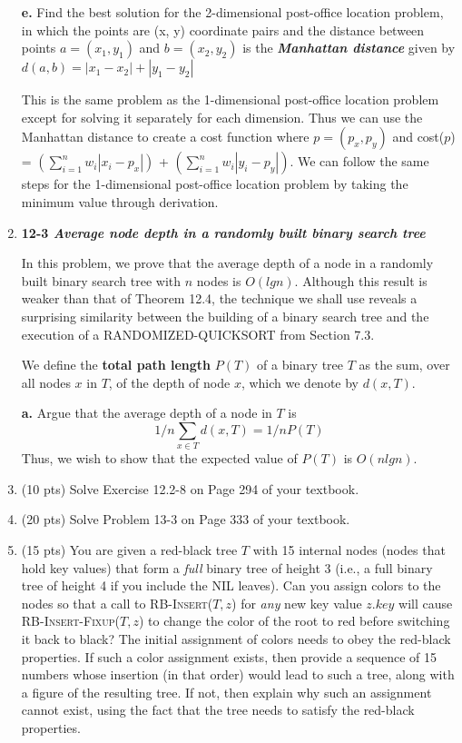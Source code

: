 \documentclass{article}
\begin{document}
\begin{enumerate}
\newpage

\subitem \textbf{e.} Find the best solution for the 2-dimensional post-office location problem, in which the points are (x, y) coordinate pairs and the distance between points $a = (x_1, y_1)$ and $b = (x_2, y_2)$ is the \textbf{\textit{Manhattan distance}} given by $d(a, b) = |x_1 - x_2| + |y_1 - y_2|$

This is the same problem as the 1-dimensional post-office location problem except for solving it separately for each dimension. Thus we can use the Manhattan distance to create a cost function where $p = (p_x, p_y)$ and cost($p$) = $(\sum_{i = 1}^{n} w_i |x_i - p_x|)$ + $(\sum_{i = 1}^{n} w_i |y_i - p_y|)$. We can follow the same steps for the 1-dimensional post-office location problem by taking the minimum value through derivation.

\newpage

\item \textbf{12-3 \textit{Average node depth in a randomly built binary search tree}}

In this problem, we prove that the average depth of a node in a randomly built binary search tree with $n$ nodes is $O(lgn)$. Although this result is weaker than that of Theorem 12.4, the technique we shall use reveals a surprising similarity between the building of a binary search tree and the execution of a RANDOMIZED-QUICKSORT from Section 7.3.
	
\hspace{10mm} We define the \textbf{total path length} $P(T)$ of a binary tree $T$ as the sum, over all nodes $x$ in $T$, of the depth of node $x$, which we denote by $d(x, T)$.

\subitem \textbf{a.} Argue that the average depth of a node in $T$ is $$1/n \sum_{x \in T} d(x, T) = 1/n P(T)$$ \hspace{11mm}Thus, we wish to show that the expected value of $P(T)$ is $O(nlgn)$. 

\newpage



\item (10 pts) Solve Exercise 12.2-8 on Page 294 of your textbook.

\item (20 pts) Solve Problem 13-3 on Page 333 of your textbook.

\item (15 pts) You are given a red-black tree $T$ with 15 internal nodes (nodes that hold key values) 
that form a \emph{full} binary tree of height 3 (i.e., a full binary tree of height 4 if you include 
the NIL leaves). Can you assign colors to the nodes so that a call to \textsc{RB-Insert}($T,z$) for
\emph{any} new key value $z.key$ will cause \textsc{RB-Insert-Fixup}($T,z$) to change the color of the 
root to red before switching it back to black? The initial assignment of colors needs to obey the 
red-black properties. If such a color assignment exists, then provide a sequence of 15 numbers whose 
insertion (in that order) would lead to such a tree, along with a figure of the resulting tree. If not, 
then explain why such an assignment cannot exist, using the fact that the tree needs to satisfy the 
red-black properties.


\end{enumerate}
\end{document}
